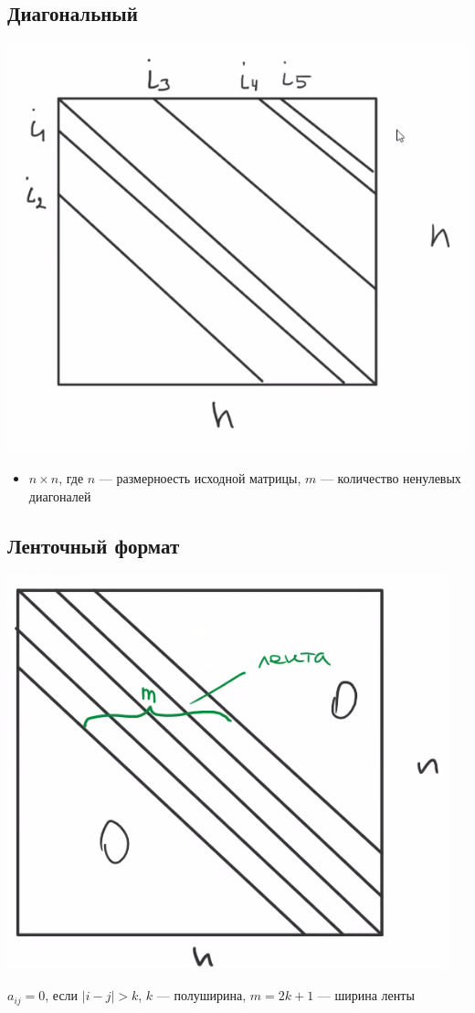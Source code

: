 \documentclass[oneside]{book}
\theoremstyle{plain}
\theoremstyle{remark}
\theoremstyle{definition}
\begin{document}
\subsection{Диагональный}
\label{sec:org5fb935b}
\begin{center}
\includegraphics[scale=0.3]{10_1.png}
\end{center}
\begin{itemize}
\item \(n \times n\), где \(n\) --- размерноесть исходной матрицы, \(m\) --- количество ненулевых диагоналей
\end{itemize}
\subsection{Ленточный формат}
\label{sec:org7bbe9ad}
\begin{center}
\includegraphics[scale=0.3]{10_2.png}
\end{center}
\(a_{ij} = 0\), если \(|i - j| > k\), \(k\) --- полуширина, \(m = 2k + 1\) --- ширина ленты
\end{document}
